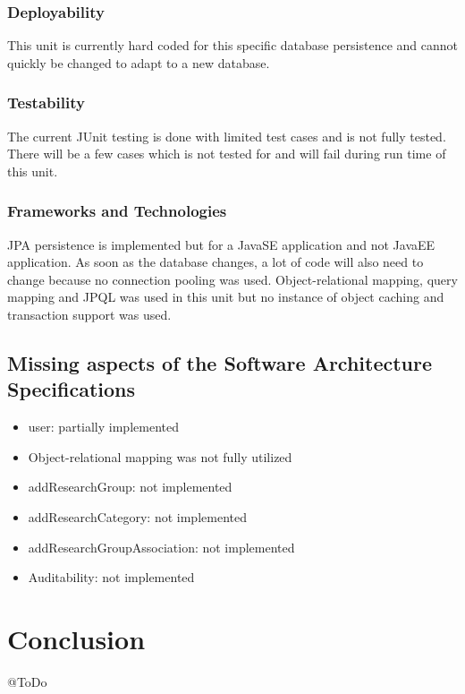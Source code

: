 \documentclass{article}
\begin{document}
	\subsubsection{Deployability}
	This unit is currently hard coded for this specific database persistence and cannot quickly be changed to adapt to a new database.
	
	\subsubsection{Testability}
	The current JUnit testing is done with limited test cases and is not fully tested. There will be a few cases which is not tested for and will fail during run time of this unit.
	
	\subsubsection{Frameworks and Technologies}
	JPA persistence is implemented but for a JavaSE application and not JavaEE application. As soon as the database changes, a lot of code will also need to change because no connection pooling was used. Object-relational mapping, query mapping and JPQL was used in this unit but no instance of object caching and transaction support was used.

     \subsection{Missing aspects of the Software Architecture Specifications}
	\begin{itemize}
		\item user: partially implemented
		\item Object-relational mapping was not fully utilized
		\item addResearchGroup: not implemented
		\item addResearchCategory: not implemented
		\item addResearchGroupAssociation: not implemented
		\item Auditability: not implemented
	\end{itemize}

\section{Conclusion}

@ToDo
\end{document}
